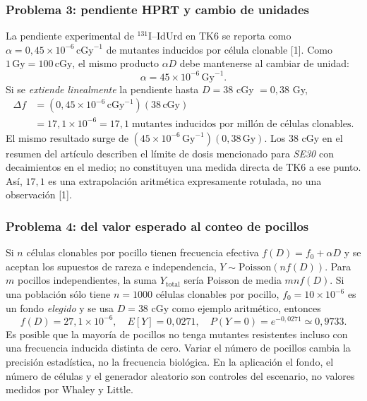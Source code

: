 \subsubsection{Problema 3: pendiente HPRT y cambio de unidades}
La pendiente experimental de $^{131}$I--IdUrd en TK6 se reporta como
$\alpha=0,45\times10^{-6}\,\mathrm{cGy}^{-1}$ de mutantes inducidos por
célula clonable [1]. Como $1\,\mathrm{Gy}=100\,\mathrm{cGy}$, el mismo
producto $\alpha D$ debe mantenerse al cambiar de unidad:
\[
\alpha=45\times10^{-6}\,\mathrm{Gy}^{-1}.
\]
Si se \emph{extiende linealmente} la pendiente hasta $D=38$ cGy
$=0,38$ Gy,
\begin{align}
\Delta f&=(0,45\times10^{-6}\,\mathrm{cGy}^{-1})
                 (38\,\mathrm{cGy})\\
 &=17,1\times10^{-6}
 =17,1\;\text{mutantes inducidos por millón de células clonables}.
\end{align}
El mismo resultado surge de $(45\times10^{-6}\,\mathrm{Gy}^{-1})(0,38\,
\mathrm{Gy})$. Los 38 cGy en el resumen del artículo describen el límite
de dosis mencionado para \emph{SE30} con decaimientos en el medio; no
constituyen una medida directa de TK6 a ese punto. Así, $17,1$ es una
extrapolación aritmética expresamente rotulada, no una observación [1].

\subsubsection{Problema 4: del valor esperado al conteo de pocillos}
Si $n$ células clonables por pocillo tienen frecuencia efectiva
$f(D)=f_0+\alpha D$ y se aceptan los supuestos de rareza e independencia,
$Y\sim\mathrm{Poisson}(nf(D))$. Para $m$ pocillos independientes,
la suma $Y_\mathrm{total}$ sería Poisson de media $mnf(D)$.
Si una población sólo tiene $n=1000$ células clonables por pocillo,
$f_0=10\times10^{-6}$ es un fondo \emph{elegido} y se usa
$D=38$ cGy como ejemplo aritmético, entonces
\[
f(D)=27,1\times10^{-6},\quad
E[Y]=0,0271,\quad P(Y=0)=e^{-0,0271}\simeq0,9733.
\]
Es posible que la mayoría de pocillos no tenga mutantes resistentes
incluso con una frecuencia inducida distinta de cero. Variar el número
de pocillos cambia la precisión estadística, no la frecuencia biológica.
En la aplicación el fondo, el número de células y el generador aleatorio
son controles del escenario, no valores medidos por Whaley y Little.

